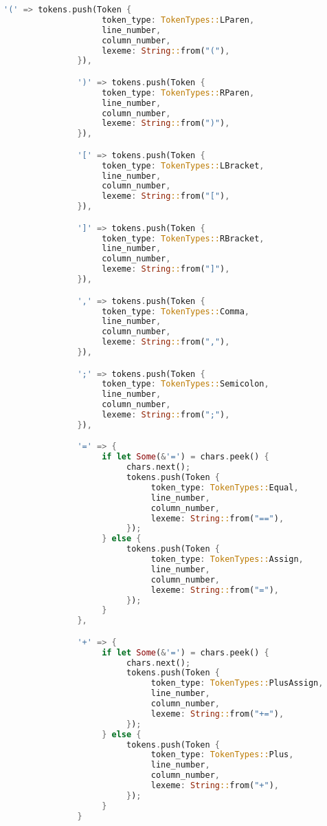 \documentclass[12pt]{article}
\begin{document}
{\begin{lstlisting}[language=Rust]
               '(' => tokens.push(Token {
                    token_type: TokenTypes::LParen,
                    line_number,
                    column_number,
                    lexeme: String::from("("),
               }),

               ')' => tokens.push(Token {
                    token_type: TokenTypes::RParen,
                    line_number,
                    column_number,
                    lexeme: String::from(")"),
               }),

               '[' => tokens.push(Token {
                    token_type: TokenTypes::LBracket,
                    line_number,
                    column_number,
                    lexeme: String::from("["),
               }),

               ']' => tokens.push(Token {
                    token_type: TokenTypes::RBracket,
                    line_number,
                    column_number,
                    lexeme: String::from("]"),
               }),

               ',' => tokens.push(Token {
                    token_type: TokenTypes::Comma,
                    line_number,
                    column_number,
                    lexeme: String::from(","),
               }),

               ';' => tokens.push(Token {
                    token_type: TokenTypes::Semicolon,
                    line_number,
                    column_number,
                    lexeme: String::from(";"),
               }),

               '=' => {
                    if let Some(&'=') = chars.peek() {
                         chars.next();
                         tokens.push(Token {
                              token_type: TokenTypes::Equal,
                              line_number,
                              column_number,
                              lexeme: String::from("=="),
                         });
                    } else {
                         tokens.push(Token {
                              token_type: TokenTypes::Assign,
                              line_number,
                              column_number,
                              lexeme: String::from("="),
                         });
                    }
               },

               '+' => {
                    if let Some(&'=') = chars.peek() {
                         chars.next();
                         tokens.push(Token {
                              token_type: TokenTypes::PlusAssign,
                              line_number,
                              column_number,
                              lexeme: String::from("+="),
                         });
                    } else {
                         tokens.push(Token {
                              token_type: TokenTypes::Plus,
                              line_number,
                              column_number,
                              lexeme: String::from("+"),
                         });
                    }
               }


\end{lstlisting}}
\end{document}
